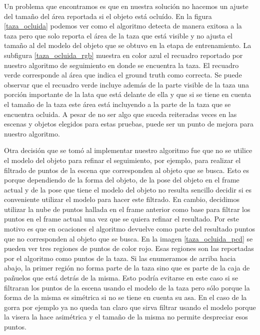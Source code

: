 Un problema que encontramos es que en nuestra solución no hacemos un ajuste del tamaño del área reportada si el objeto está ocluído. En la figura \ref{taza_ocluida} podemos ver como el algoritmo detecta de manera exitosa a la taza pero que solo reporta el área de la taza que está visible y no ajusta el tamaño al del modelo del objeto que se obtuvo en la etapa de entrenamiento. La subfigura \ref{taza_ocluida_rgb} muestra en color azul el recuadro reportado por nuestro algoritmo de seguimiento en donde se encuentra la taza. El recuadro verde corresponde al área que indica el ground truth como correcta. Se puede observar que el recuadro verde incluye además de la parte visible de la taza una porción importante de la lata que está delante de ella y que si se tiene en cuenta el tamaño de la taza este área está incluyendo a la parte de la taza que se encuentra ocluida. A pesar de no ser algo que suceda reiteradas veces en las escenas y objetos elegidos para estas pruebas, puede ser un punto de mejora para nuestro algoritmo. 

Otra decisión que se tomó al implementar nuestro algoritmo fue que no se utilice el modelo del objeto para refinar el seguimiento, por ejemplo, para realizar el filtrado de puntos de la escena que corresponden al objeto que se busca. Esto es porque dependiendo de la forma del objeto, de la pose del objeto en el frame actual y de la pose que tiene el modelo del objeto no resulta sencillo decidir si es conveniente utilizar el modelo para hacer este filtrado. En cambio, decidimos utilizar la nube de puntos hallada en el frame anterior como base para filtrar los puntos en el frame actual una vez que se quiera refinar el resultado. Por este motivo es que en ocaciones el algoritmo devuelve como parte del resultado puntos que no corresponden al objeto que se busca. En la imagen \ref{taza_ocluida_pcd} se pueden ver tres regiones de puntos de color rojo. Esas regiones son las reportadas por el algoritmo como puntos de la taza. Si las enumeramos de arriba hacia abajo, la primer región no forma parte de la taza sino que es parte de la caja de pañuelos que está detrás de la misma. Esto podría evitarse en este caso si se filtraran los puntos de la escena usando el modelo de la taza pero sólo porque la forma de la misma es simétrica si no se tiene en cuenta su asa. En el caso de la gorra por ejemplo ya no queda tan claro que sirva filtrar usando el modelo porque la visera la hace asimétrica y el tamaño de la misma no permite despreciar esos puntos. 

